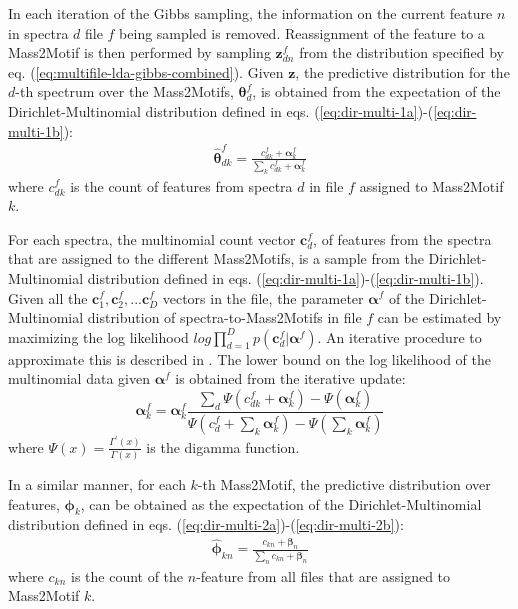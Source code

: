 In each iteration of the Gibbs sampling, the information on the current feature $n$ in spectra $d$ file $f$ being sampled is removed. Reassignment of the feature to a Mass2Motif is then performed by sampling $\boldsymbol{z}_{dn}^f$ from the distribution specified by eq. (\ref{eq:multifile-lda-gibbs-combined}). Given $\boldsymbol{z}$, the predictive distribution for the $d$-th spectrum over the Mass2Motifs, $\boldsymbol{\theta}_{d}^f$, is obtained from the expectation of the Dirichlet-Multinomial distribution defined in eqs. (\ref{eq:dir-multi-1a})-(\ref{eq:dir-multi-1b}):
\begin{align}
\boldsymbol{\hat{\theta}}_{dk}^f = \frac{c_{dk}^f+\boldsymbol{\alpha}^f_k}{\sum_{k} c_{dk}^f+\boldsymbol{\alpha}^f_k}
\end{align}
where $c_{dk}^f$ is the count of features from spectra $d$ in file $f$ assigned to Mass2Motif $k$. 

For each spectra, the multinomial count vector $\textbf{c}_d^f$, of features from the spectra that are assigned to the different Mass2Motifs, is a sample from the Dirichlet-Multinomial distribution defined in eqs. (\ref{eq:dir-multi-1a})-(\ref{eq:dir-multi-1b}). Given all the $\textbf{c}_1^f,\textbf{c}_2^f, ... \textbf{c}_D^f$ vectors in the file, the parameter $\boldsymbol{\alpha}^f$ of the Dirichlet-Multinomial distribution of spectra-to-Mass2Motifs in file $f$ can be estimated by maximizing the log likelihood $log\prod_{d=1}^{D}  p(\boldsymbol{c}_{d}^f \vert \boldsymbol{\alpha}^f)$. An iterative procedure to approximate this is described in \cite{Minka2003}. The lower bound on the log likelihood of the multinomial data given $\boldsymbol{\alpha}^f$ is obtained from the iterative update:
\begin{equation}
\boldsymbol{\alpha}^f_k=\boldsymbol{\alpha}^f_k \frac{\sum_{d} \Psi(c_{dk}^f + \boldsymbol{\alpha}_k^f)-\Psi(\boldsymbol{\alpha}_k^f)}{\Psi(c_{d}^f + \sum_{k} \boldsymbol{\alpha}_k^f)-\Psi(\sum_{k} \boldsymbol{\alpha}_k^f)}
\end{equation}
where $\Psi(x)=\frac{\Gamma^{'}(x)}{\Gamma(x)}$ is the digamma function.

In a similar manner, for each $k$-th Mass2Motif, the predictive distribution over features, $\boldsymbol{\phi}_k$, can be obtained as the expectation of the Dirichlet-Multinomial distribution defined in eqs. (\ref{eq:dir-multi-2a})-(\ref{eq:dir-multi-2b}):
\begin{align}
\boldsymbol{\hat{\phi}}_{kn} = \frac{c_{kn}+\boldsymbol{\beta}_n}{\sum_{n} c_{kn}+\boldsymbol{\beta}_n}
\end{align}
where $c_{kn}$ is the count of the $n$-feature from all files that are assigned to Mass2Motif $k$. 

